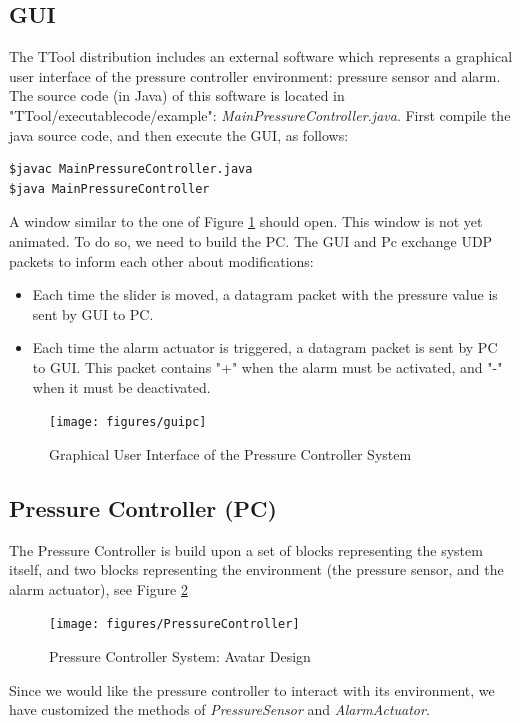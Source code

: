 \documentclass[12pt]{article}
\begin{document}
\subsection{GUI}
The TTool distribution includes an external software which represents a graphical user interface of the pressure controller environment: pressure sensor and alarm. The source code (in Java) of this software is located in "TTool/executablecode/example": \textit{MainPressureController.java}.
 First compile the java source code, and then execute the GUI, as follows:
\begin{lstlisting}
$javac MainPressureController.java
$java MainPressureController
\end{lstlisting}
A window similar to the one of Figure \ref{fig:guipc} should open. This window is not yet animated. To do so, we need to build the PC. The GUI and Pc exchange UDP packets to inform each other about modifications:
\begin{itemize}
\item Each time the slider is moved, a datagram packet with the pressure value is sent by GUI to PC.
\item Each time the alarm actuator is triggered, a datagram packet is sent by PC to GUI. This packet contains "+" when the alarm must be activated, and "-" when it must be deactivated.
\end{itemize}



\begin{figure}[htbp]
\centering
\texttt{[image: figures/guipc]}
\caption{Graphical User Interface of the Pressure Controller System} \label{fig:guipc}
\end{figure}

\subsection{Pressure Controller (PC)}
The Pressure Controller is build upon a set of blocks representing the system itself, and two blocks representing the environment (the pressure sensor, and the alarm actuator), see Figure \ref{fig:pc}

\begin{figure}[htbp]
\centering
\texttt{[image: figures/PressureController]}
\caption{Pressure Controller System: Avatar Design} \label{fig:pc}
\end{figure}

Since we would like the pressure controller to interact with its environment, we have customized the methods of \textit{PressureSensor} and \textit{AlarmActuator}. 
\end{document}
